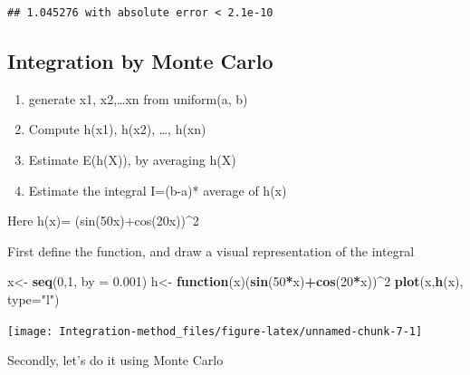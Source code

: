 \documentclass[
]{article}
\newenvironment{Shaded}{\begin{snugshade}}{\end{snugshade}}
\newcommand{\AttributeTok}[1]{\textcolor[rgb]{0.13,0.29,0.53}{#1}}
\newcommand{\ControlFlowTok}[1]{\textcolor[rgb]{0.13,0.29,0.53}{\textbf{#1}}}
\newcommand{\DecValTok}[1]{\textcolor[rgb]{0.00,0.00,0.81}{#1}}
\newcommand{\FloatTok}[1]{\textcolor[rgb]{0.00,0.00,0.81}{#1}}
\newcommand{\FunctionTok}[1]{\textcolor[rgb]{0.13,0.29,0.53}{\textbf{#1}}}
\newcommand{\NormalTok}[1]{#1}
\newcommand{\OtherTok}[1]{\textcolor[rgb]{0.56,0.35,0.01}{#1}}
\newcommand{\SpecialCharTok}[1]{\textcolor[rgb]{0.81,0.36,0.00}{\textbf{#1}}}
\newcommand{\StringTok}[1]{\textcolor[rgb]{0.31,0.60,0.02}{#1}}
\providecommand{\tightlist}{%
  \setlength{\itemsep}{0pt}\setlength{\parskip}{0pt}}
\begin{document}
\begin{verbatim}
## 1.045276 with absolute error < 2.1e-10
\end{verbatim}

\hypertarget{integration-by-monte-carlo}{%
\subsection{Integration by Monte
Carlo}\label{integration-by-monte-carlo}}

\begin{enumerate}
\def\labelenumi{\arabic{enumi}.}
\tightlist
\item
  generate x1, x2,\ldots xn from uniform(a, b)
\item
  Compute h(x1), h(x2), \ldots, h(xn)
\item
  Estimate E(h(X)), by averaging h(X)
\item
  Estimate the integral I=(b-a)* average of h(x)
\end{enumerate}

Here h(x)= (sin(50x)+cos(20x))\^{}2

First define the function, and draw a visual representation of the
integral

\begin{Shaded}
\begin{Highlighting}[]
\NormalTok{x}\OtherTok{\textless{}{-}} \FunctionTok{seq}\NormalTok{(}\DecValTok{0}\NormalTok{,}\DecValTok{1}\NormalTok{, }\AttributeTok{by =} \FloatTok{0.001}\NormalTok{)}
\NormalTok{h}\OtherTok{\textless{}{-}} \ControlFlowTok{function}\NormalTok{(x)(}\FunctionTok{sin}\NormalTok{(}\DecValTok{50}\SpecialCharTok{*}\NormalTok{x)}\SpecialCharTok{+}\FunctionTok{cos}\NormalTok{(}\DecValTok{20}\SpecialCharTok{*}\NormalTok{x))}\SpecialCharTok{\^{}}\DecValTok{2}
\FunctionTok{plot}\NormalTok{(x,}\FunctionTok{h}\NormalTok{(x), }\AttributeTok{type=}\StringTok{"l"}\NormalTok{)}
\end{Highlighting}
\end{Shaded}

\begin{center}\texttt{[image: Integration-method\_files/figure-latex/unnamed-chunk-7-1]} \end{center}

Secondly, let's do it using Monte Carlo
\end{document}
